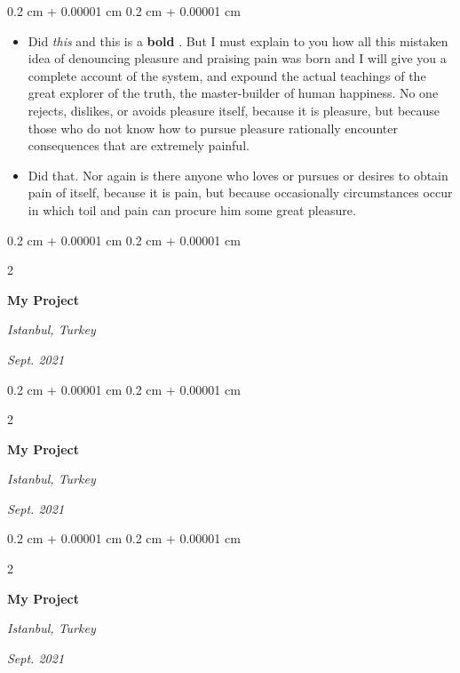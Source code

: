 \documentclass[10pt, letterpaper]{article}
\newenvironment{highlights}{
    \begin{itemize}[
        topsep=0.10 cm,
        parsep=0.10 cm,
        partopsep=0pt,
        itemsep=0pt,
        leftmargin=0.4 cm + 10pt
    ]
}{
    \end{itemize}
} %
\newenvironment{onecolentry}{
    \begin{adjustwidth}{
        0.2 cm + 0.00001 cm
    }{
        0.2 cm + 0.00001 cm
    }
}{
    \end{adjustwidth}
} %
\newenvironment{twocolentry}[2][]{
    \onecolentry
    \def\secondColumn{#2}
    \setcolumnwidth{\fill, 4.5 cm}
    \begin{paracol}{2}
}{
    \switchcolumn \raggedleft \secondColumn
    \end{paracol}
    \endonecolentry
} %
\let\hrefWithoutArrow\href
\renewcommand{\href}[2]{\hrefWithoutArrow{#1}{\mbox{\ifthenelse{\equal{#2}{}}{ }{#2 }\raisebox{.15ex}{\footnotesize \faExternalLink*}}}}
\begin{document}
        \vspace{0.10 cm-3px}
        \begin{onecolentry}
            \begin{highlights}
                \item Did \textit{this} and this is a \textbf{bold} \href{https://example.com}{link}. But I must explain to you how all this mistaken idea of denouncing pleasure and praising pain was born and I will give you a complete account of the system, and expound the actual teachings of the great explorer of the truth, the master-builder of human happiness. No one rejects, dislikes, or avoids pleasure itself, because it is pleasure, but because those who do not know how to pursue pleasure rationally encounter consequences that are extremely painful.
                \item Did that. Nor again is there anyone who loves or pursues or desires to obtain pain of itself, because it is pain, but because occasionally circumstances occur in which toil and pain can procure him some great pleasure.
            \end{highlights}
        \end{onecolentry}


        \vspace{0.2 cm-3px}

        \begin{twocolentry}{
        \textit{Istanbul, Turkey}    
            
        \textit{Sept. 2021}}
            \textbf{My Project}
        \end{twocolentry}



        \vspace{0.2 cm-3px}

        \begin{twocolentry}{
        \textit{Istanbul, Turkey}    
            
        \textit{Sept. 2021}}
            \textbf{My Project}
        \end{twocolentry}



        \vspace{0.2 cm-3px}

        \begin{twocolentry}{
        \textit{Istanbul, Turkey}    
            
        \textit{Sept. 2021}}
            \textbf{My Project}
        \end{twocolentry}
\end{document}
